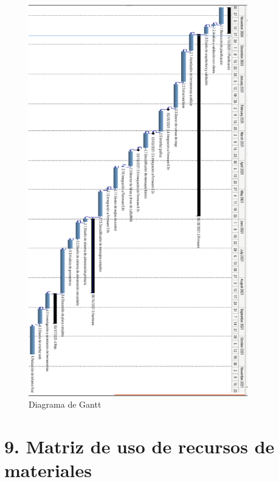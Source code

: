 \documentclass[11pt]{charter}
\begin{document}
\begin{figure}[htpb]
\centering
\includegraphics[width=0.85\textwidth]{./Figuras/gantG.png}
\caption{Diagrama de Gantt}
\label{fig:redLoRa}
\end{figure}

\section{9. Matriz de uso de recursos de materiales}
\label{sec:recursos}
\end{document}

